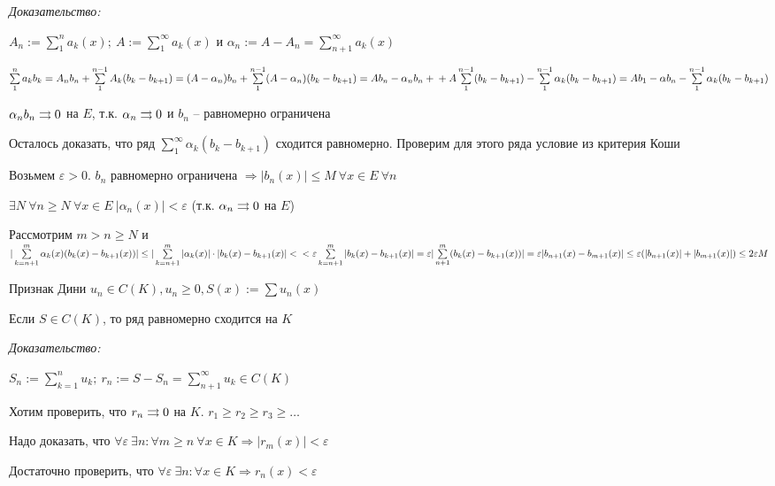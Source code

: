 \documentclass[12pt]{article}
\begin{document}
\textit{Доказательство:}

$A_n := \sum\limits_1^n a_k(x);\ A := \sum\limits_1^\infty a_k(x)$ и $\alpha_n := A - A_n = \sum\limits_{n + 1}^\infty a_k(x)$

$\sum\limits_1^n a_kb_k = A_nb_n + \sum\limits_1^{n - 1} A_k(b_k - b_{k + 1}) = (A - \alpha_n)b_n + \sum\limits_1^{n - 1} (A - \alpha_n)(b_k - b_{k + 1}) = Ab_n - \alpha_nb_n + \\ + A\sum\limits_1^{n - 1}(b_k - b_{k + 1}) - \sum\limits_1^{n - 1} \alpha_k(b_k - b_{k + 1}) = Ab_1 - \alpha b_n - \sum\limits_1^{n - 1} \alpha_k(b_k - b_{k + 1})$

$\alpha_nb_n \rightrightarrows 0$ на $E$, т.к. $\alpha_n \rightrightarrows 0$ и $b_n$ -- равномерно ограничена

Осталось доказать, что ряд $\sum\limits_1^\infty \alpha_k(b_k - b_{k + 1})$ сходится равномерно. Проверим для этого ряда условие из критерия Коши

Возьмем $\varepsilon > 0$. $b_n$ равномерно ограничена $\Rightarrow |b_n(x)| \leq M\ \forall x \in E\ \forall n$

$\exists N\ \forall n \geq N\ \forall x \in E\ |\alpha_n(x)| < \varepsilon$ (т.к. $\alpha_n \rightrightarrows 0$ на $E$)

Рассмотрим $m > n \geq N$ и $|\sum\limits_{k = n + 1}^m \alpha_k(x) (b_k(x) - b_{k + 1}(x))| \leq |\sum\limits_{k = n + 1}^m |\alpha_k(x)| \cdot |b_k(x) - b_{k + 1}(x)| < \\ < \varepsilon \sum\limits_{k = n + 1}^m |b_k(x) - b_{k + 1}(x)| = \varepsilon |\sum\limits_{n + 1}^m (b_k(x) - b_{k + 1}(x))| = \varepsilon |b_{n + 1}(x) - b_{m + 1}(x)| \leq \varepsilon (|b_{n + 1}(x)| + |b_{m + 1}(x)|) \leq 2\varepsilon M$

\begin{theo}{Признак Дини}
    $u_n \in C(K), u_n \geq 0, S(x) := \sum u_n(x)$

    Если $S \in C(K)$, то ряд равномерно сходится на $K$
\end{theo}

\textit{Доказательство:}

$S_n := \sum\limits_{k = 1}^n u_k;\ r_n := S - S_n = \sum\limits_{n + 1}^\infty u_k \in C(K)$

Хотим проверить, что $r_n \rightrightarrows 0$ на $K$. $r_1 \geq r_2 \geq r_3 \geq \ldots$

Надо доказать, что $\forall \varepsilon\ \exists n : \forall m \geq n\ \forall x \in K \Rightarrow |r_m(x)| < \varepsilon$

Достаточно проверить, что $\forall \varepsilon\ \exists n : \forall x \in K \Rightarrow r_n(x) < \varepsilon$
\end{document}
